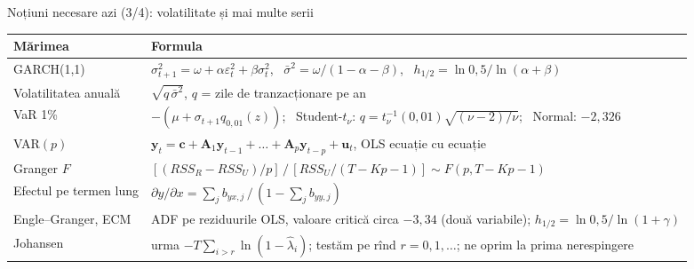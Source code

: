 \begin{frame}{Noțiuni necesare azi (3/4): volatilitate și mai multe serii}
\itemsize{\small}
{\renewcommand{\arraystretch}{1.3}\begin{center}
\footnotesize
\begin{tabular}{l>{\raggedright\arraybackslash}p{9.4cm}}
\toprule
\textbf{Mărimea} & \textbf{Formula} \\
\midrule
GARCH(1,1) & $\sigma_{t+1}^2 = \omega + \alpha\varepsilon_t^2 + \beta\sigma_t^2$, \ $\bar\sigma^2 = \omega/(1 - \alpha - \beta)$, \ $h_{1/2} = \ln 0{,}5/\ln(\alpha + \beta)$ \\
Volatilitatea anuală & $\sqrt{q\,\bar\sigma^2}$, $q$ = zile de tranzacționare pe an \\
VaR 1\% & $-(\mu + \sigma_{t+1}q_{0{,}01}(z))$; \ Student-$t_\nu$: $q = t_\nu^{-1}(0{,}01)\sqrt{(\nu - 2)/\nu}$; \ Normal: $-2{,}326$ \\
VAR$(p)$ & $\mathbf y_t = \mathbf c + \mathbf A_1\mathbf y_{t-1} + \dots + \mathbf A_p\mathbf y_{t-p} + \mathbf u_t$, OLS ecuație cu ecuație \\
Granger $F$ & $[(RSS_R - RSS_U)/p]\,/\,[RSS_U/(T - Kp - 1)] \sim F(p, T - Kp - 1)$ \\
Efectul pe termen lung & $\partial y/\partial x = \sum_j b_{yx,j}\,/\,(1 - \sum_j b_{yy,j})$ \\
Engle--Granger, ECM & ADF pe reziduurile OLS, valoare critică circa $-3{,}34$ (două variabile); $h_{1/2} = \ln 0{,}5/\ln(1 + \gamma)$ \\
Johansen & urma $-T\sum_{i>r}\ln(1 - \hat\lambda_i)$; testăm pe rînd $r = 0, 1, \dots$; ne oprim la prima nerespingere \\
\bottomrule
\end{tabular}
\end{center}
}
\end{frame}

